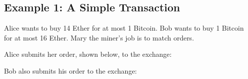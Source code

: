 \documentclass[a4paper]{article}
\begin{document}
	\subsection*{Example 1: A Simple Transaction}
    	Alice wants to buy 14 Ether for at most 1 Bitcoin. Bob wants
        to buy 1 Bitcoin for at most 16 Ether. Mary the miner's job
        is to match orders.

        Alice submits her order, shown below, to the exchange:
        \begin{center}
        \end{center}

        Bob also submits his order to the exchange:
        \begin{center}
        \end{center}
\end{document}
